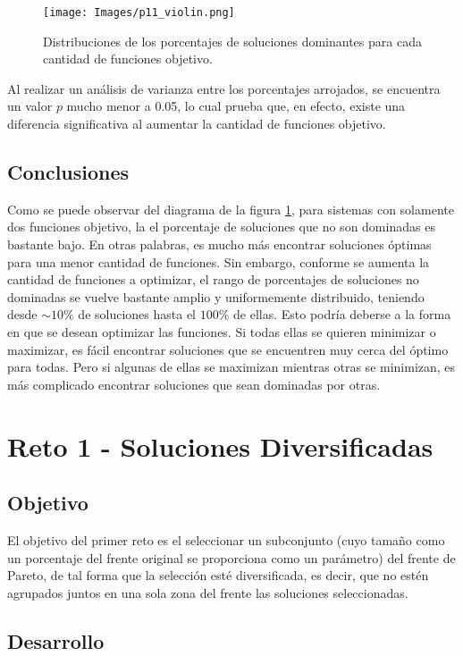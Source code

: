 \documentclass{report}
\begin{document}
\begin{figure}[h]
    \centering
    \texttt{[image: Images/p11\_violin.png]}
    \caption{Distribuciones de los porcentajes de soluciones dominantes para cada cantidad de funciones objetivo.}
    \label{fig2}
\end{figure}

Al realizar un an\'alisis de varianza entre los porcentajes arrojados, se encuentra un valor $p$ mucho menor a 0.05, lo cual prueba que, en efecto, existe una diferencia significativa al aumentar la cantidad de funciones objetivo.

\section{Conclusiones}
Como se puede observar del diagrama de la figura \ref{fig2}, para sistemas con solamente dos funciones objetivo, la el porcentaje de soluciones que no son dominadas es bastante bajo. En otras palabras, es mucho m\'as encontrar soluciones \'optimas para una menor cantidad de funciones. Sin embargo, conforme se aumenta la cantidad de funciones a optimizar, el rango de porcentajes de soluciones no dominadas se vuelve bastante amplio y uniformemente distribuido, teniendo desde $\sim10\%$ de soluciones hasta el $100\%$ de ellas. Esto podr\'ia deberse a la forma en que se desean optimizar las funciones. Si todas ellas se quieren minimizar o maximizar, es f\'acil encontrar soluciones que se encuentren muy cerca del \'optimo para todas. Pero si algunas de ellas se maximizan mientras otras se minimizan, es m\'as complicado encontrar soluciones que sean dominadas por otras.

\chapter{Reto 1 - Soluciones Diversificadas}

\section{Objetivo}

El objetivo del primer reto es el seleccionar un subconjunto (cuyo tama\~no como un porcentaje del frente original se proporciona como un par\'ametro) del frente de Pareto, de tal forma que la selecci\'on est\'e diversificada, es decir, que no est\'en agrupados juntos en una sola zona del frente las soluciones seleccionadas.

\section{Desarrollo}
\end{document}
